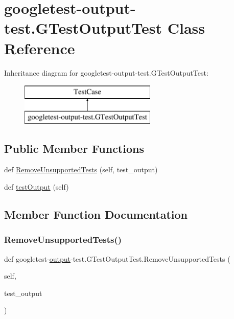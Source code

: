 \hypertarget{classgoogletest-output-test_1_1_g_test_output_test}{}\section{googletest-\/output-\/test.G\+Test\+Output\+Test Class Reference}
\label{classgoogletest-output-test_1_1_g_test_output_test}
Inheritance diagram for googletest-\/output-\/test.G\+Test\+Output\+Test\+:\begin{figure}[H]
\begin{center}
\leavevmode
\includegraphics[height=2.000000cm]{da/d88/classgoogletest-output-test_1_1_g_test_output_test}
\end{center}
\end{figure}
\subsection*{Public Member Functions}
\begin{DoxyCompactItemize}
\item 
def \mbox{\hyperlink{classgoogletest-output-test_1_1_g_test_output_test_af058c7917b05d06b0e6249061db264a3}{Remove\+Unsupported\+Tests}} (self, test\+\_\+output)
\item 
def \mbox{\hyperlink{classgoogletest-output-test_1_1_g_test_output_test_a4ab77925377e6c837d33f07960a31212}{test\+Output}} (self)
\end{DoxyCompactItemize}


\subsection{Member Function Documentation}
\mbox{\label{classgoogletest-output-test_1_1_g_test_output_test_af058c7917b05d06b0e6249061db264a3}} 
\subsubsection{\texorpdfstring{RemoveUnsupportedTests()}{RemoveUnsupportedTests()}}
{\footnotesize\ttfamily def googletest-\/\mbox{\hyperlink{namespacegoogletest-output-test_ab3df9ce09186215a36c30454cf282417}{output}}-\/test.\+G\+Test\+Output\+Test.\+Remove\+Unsupported\+Tests (\begin{DoxyParamCaption}\item[{}]{self,  }\item[{}]{test\+\_\+output }\end{DoxyParamCaption})}

